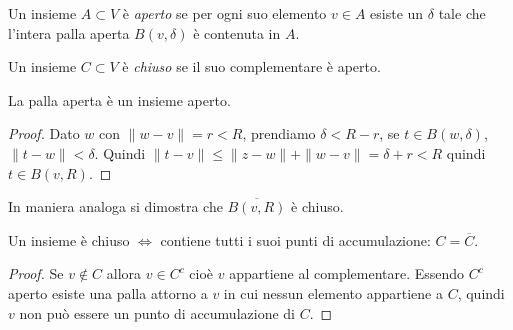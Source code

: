 \begin{definition}[aperto]
Un insieme $A \subset V$ è \emph{aperto} se per ogni suo elemento $v\in A$
esiste un $\delta$ tale che l'intera palla aperta $B(v, \delta)$ è contenuta
in $A$.
\end{definition}

\begin{definition}[chiuso]
Un insieme $C \subset V$ è \emph{chiuso} se il suo complementare è aperto.
\end{definition}

\begin{theorem}
La palla aperta è un insieme aperto.
\end{theorem}
\begin{proof}
Dato $w$ con $\|w-v\|=r<R$, prendiamo
$\delta < R-r$, se $t \in B(w, \delta)$, $\|t-w\| < \delta$. Quindi $\|t-v\|
\leq \|z-w\| + \|w-v\| = \delta +r < R$ quindi $t \in B(v,R)$. 
\end{proof}
In maniera analoga si dimostra che $\overline{B(v,R)}$ è chiuso.
\begin{theorem}
Un insieme è chiuso $\iff$ contiene tutti i suoi punti di accumulazione:
$C = \overline{C}$.
\end{theorem}
\begin{proof}
Se $v \notin C$ allora $v \in C^c$ cioè $v$ appartiene al
complementare. Essendo $C^c$ aperto esiste una palla attorno a $v$ in cui
nessun elemento appartiene a $C$, quindi $v$ non può essere un punto di
accumulazione di $C$.
\end{proof}
